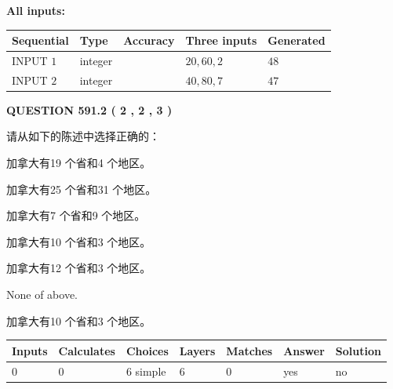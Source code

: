 \documentclass{ctexart}
\begin{document}
   
   
   
\noindent\vspace{0.1in}\hspace{-0.08in} {\textbf{\Large{All inputs: }}}
   
   
  
  
\noindent\begin{tabular}{|l|l|l|l|l|}
\hline
 Sequential & Type & Accuracy & Three inputs & Generated \\ 
\hline
 
 
  INPUT $  1 $ & integer &  & $
 20
 , 
 60
 , 
 2
 $ & $ 48 $ 
 \\  \hline  
 
 
  INPUT $  2 $ & integer &  & $
 40
 , 
 80
 , 
 7
 $ & $ 47 $ 
 \\  \hline  
 \end{tabular}
   
   
  
\vspace{0.2in}
  
{\textbf{\Large{QUESTION
591.2 
 ( 2 , 2 , 3 )
}}}
  
  
请从如下的陈述中选择正确的：
 
 
加拿大有19 个省和4 个地区。
 
 
加拿大有25 个省和31 个地区。
 
 
加拿大有7 个省和9 个地区。
 
 
加拿大有10 个省和3 个地区。
 
 
加拿大有12 个省和3 个地区。
 
 
 None of above.
 
 
\noindent{}
 
 
加拿大有10 个省和3 个地区。
 
 
\noindent{}
 
 
   
   
   
   
\noindent\begin{tabular}{|l|l|l|l|l|l|l|}
 \hline
Inputs & Calculates & Choices & Layers & Matches & Answer & Solution \\ \hline
 0  & 
 0  & 
 6
  simple  
  & 
 6  & 
 0  & 
  yes & 
  no 
  \\ \hline
 \end{tabular}
   
\end{document}
